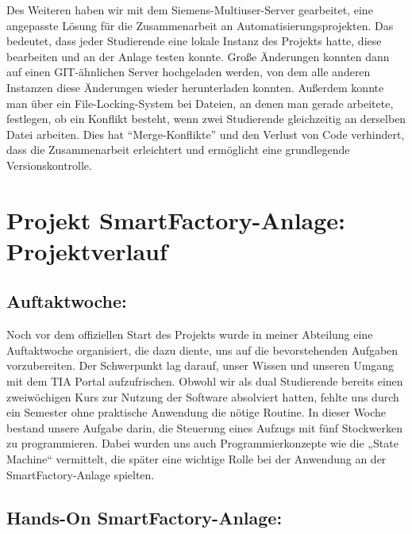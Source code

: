 Des Weiteren haben wir mit dem Siemens-Multiuser-Server gearbeitet, eine angepasste Lösung für die Zusammenarbeit an 
Automatisierungsprojekten. Das bedeutet, dass jeder Studierende eine lokale 
Instanz des Projekts hatte, diese bearbeiten und an der Anlage testen konnte. Große Änderungen konnten dann auf einen 
GIT-ähnlichen Server hochgeladen werden, von dem alle anderen Instanzen diese Änderungen wieder herunterladen konnten. 
Außerdem konnte man über ein File-Locking-System bei Dateien, an denen man gerade arbeitete, festlegen, ob ein Konflikt 
besteht, wenn zwei Studierende gleichzeitig an derselben Datei arbeiten. Dies hat ``Merge-Konflikte'' und den Verlust 
von Code verhindert, dass die Zusammenarbeit erleichtert und ermöglicht eine grundlegende Versionskontrolle.

\section{Projekt SmartFactory-Anlage: Projektverlauf}

\subsection{Auftaktwoche:}

Noch vor dem offiziellen Start des Projekts wurde in meiner Abteilung eine Auftaktwoche organisiert, die dazu diente, 
uns auf die bevorstehenden Aufgaben vorzubereiten. Der Schwerpunkt lag darauf, unser Wissen und unseren Umgang mit dem 
TIA Portal aufzufrischen. Obwohl wir als dual Studierende bereits einen zweiwöchigen Kurs zur Nutzung der Software 
absolviert hatten, fehlte uns durch ein Semester ohne praktische Anwendung die nötige Routine. In dieser Woche bestand 
unsere Aufgabe darin, die Steuerung eines Aufzugs mit fünf Stockwerken zu programmieren. Dabei wurden uns auch 
Programmierkonzepte wie die „State Machine“ vermittelt, die später eine wichtige Rolle bei der Anwendung an der 
SmartFactory-Anlage spielten.

\subsection{Hands-On SmartFactory-Anlage:}

